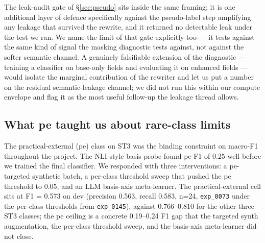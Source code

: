 The leak-audit gate of \S\ref{sec:pseudo} sits inside the same framing: it is one additional layer of defence specifically against the pseudo-label step amplifying any leakage that survived the rewrite, and it returned no detectable leak under the test we ran. %
We name the limit of that gate explicitly too --- it tests against the same kind of signal the masking diagnostic tests against, not against the softer semantic channel. A genuinely falsifiable extension of the diagnostic --- training a classifier on base-only fields and evaluating it on enhanced fields --- would isolate the marginal contribution of the rewriter and let us put a number on the residual semantic-leakage channel; we did not run this within our compute envelope and flag it as the most useful follow-up the leakage thread allows.

\subsection{What \textsf{pe} taught us about rare-class limits}
\label{sec:disc-pe}

The practical-external (\textsf{pe}) class on ST3 was the binding constraint on macro-F1 throughout the project. The NLI-style basis probe found \textsf{pe}-F1 of 0.25 well before we trained the final classifier. %
We responded with three interventions: a \textsf{pe}-targeted synthetic batch, a per-class threshold sweep that pushed the \textsf{pe} threshold to 0.05, and an LLM basis-axis meta-learner. %
The practical-external cell sits at F1 = 0.573 on dev (precision 0.563, recall 0.583, n=24, \texttt{exp\_0073} under the per-class thresholds from \texttt{exp\_0145}), against 0.766--0.810 for the other three ST3 classes; the \textsf{pe} ceiling is a concrete 0.19--0.24 F1 gap that the targeted synth augmentation, the per-class threshold sweep, and the basis-axis meta-learner did not close. %
